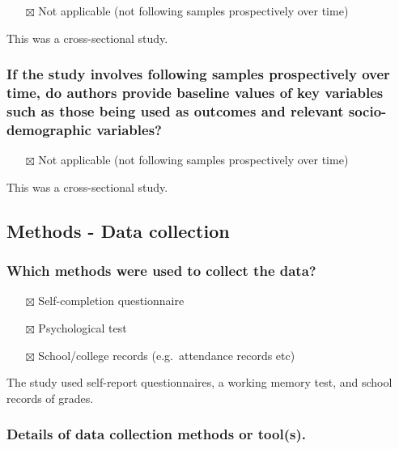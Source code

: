 \documentclass[
  doc, a4paper]{apa7}
\providecommand{\tightlist}{%
  \setlength{\itemsep}{0pt}\setlength{\parskip}{0pt}}
\begin{document}
\begin{itemize}
\tightlist
\item[$\boxtimes$]
  Not applicable (not following samples prospectively over time)
\end{itemize}

This was a cross-sectional study.

\subsubsection{If the study involves following samples prospectively over time, do authors provide baseline values of key variables such as those being used as outcomes and relevant socio-demographic variables?}\label{if-the-study-involves-following-samples-prospectively-over-time-do-authors-provide-baseline-values-of-key-variables-such-as-those-being-used-as-outcomes-and-relevant-socio-demographic-variables}

\begin{itemize}
\tightlist
\item[$\boxtimes$]
  Not applicable (not following samples prospectively over time)
\end{itemize}

This was a cross-sectional study.

\subsection{Methods - Data collection}\label{methods---data-collection}

\subsubsection{Which methods were used to collect the data?}\label{which-methods-were-used-to-collect-the-data}

\begin{itemize}
\tightlist
\item[$\boxtimes$]
  Self-completion questionnaire
\item[$\boxtimes$]
  Psychological test
\item[$\boxtimes$]
  School/college records (e.g.~attendance records etc)
\end{itemize}

The study used self-report questionnaires, a working memory test, and school records of grades.

\subsubsection{Details of data collection methods or tool(s).}\label{details-of-data-collection-methods-or-tools.}
\end{document}
